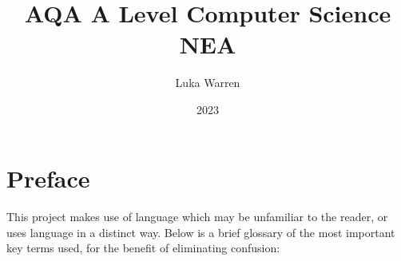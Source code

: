 \documentclass{article}
\title{AQA A Level Computer Science NEA}
\date{2023}
\author{Luka Warren}
\begin{document}
	\maketitle
	\tableofcontents
	\newpage

	
	\setcounter{section}{-1}
	\section {Preface}
	\paragraph{}
	This project makes use of language which may be unfamiliar to the reader, or uses language in a distinct way. Below is a brief glossary of the most important key terms used, for the benefit of eliminating confusion:
	
\end{document}
